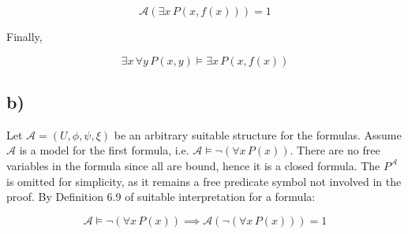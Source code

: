 \documentclass[unicode,11pt,a4paper,oneside,numbers=endperiod,openany]{scrartcl}
\def\struct{\mathcal{A}}
\begin{document}
\[
\struct (\exists x \, P(x, f(x))) = 1 
\]

\noindent Finally,

\[
\exists x \, \forall y \, P(x,y) \models \exists x \, P(x,f(x))
\]

\subsection*{b)}

Let \( \struct = (U, \phi, \psi, \xi) \) be an arbitrary suitable structure for the formulas.
Assume \( \struct \) is a model for the first formula, 
i.e. \( \struct \models \neg (\forall x \, P(x)) \).
There are no free variables in the formula since all are bound, hence it is a closed formula. 
The \( P^\struct \) is omitted for simplicity, as it remains a free predicate symbol 
not involved in the proof.
By Definition 6.9 of suitable interpretation for a formula:

\[
\struct \models \neg (\forall x \, P(x)) 
\implies 
\struct\left( 
     \neg (\forall x \, P(x))
\right) = 1
\]
\end{document}
